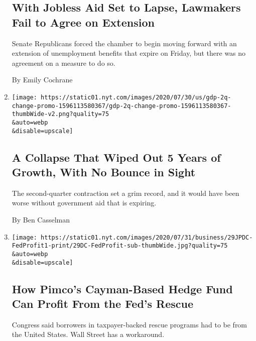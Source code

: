 \begin{enumerate}
{  \subsection{With Jobless Aid Set to Lapse, Lawmakers Fail to Agree on
  Extension}\label{with-jobless-aid-set-to-lapse-lawmakers-fail-to-agree-on-extension}}

  Senate Republicans forced the chamber to begin moving forward with an
  extension of unemployment benefits that expire on Friday, but there
  was no agreement on a measure to do so.

  By Emily Cochrane
\item
  \href{/2020/07/30/business/economy/q2-gdp-coronavirus-economy.html}{}

  \texttt{[image: https://static01.nyt.com/images/2020/07/30/us/gdp-2q-change-promo-1596113580367/gdp-2q-change-promo-1596113580367-thumbWide-v2.png?quality=75\\\&auto=webp\\\&disable=upscale]}

  \hypertarget{a-collapse-that-wiped-out-5-years-of-growth-with-no-bounce-in-sight}{%
  \subsection{A Collapse That Wiped Out 5 Years of Growth, With No
  Bounce in
  Sight}\label{a-collapse-that-wiped-out-5-years-of-growth-with-no-bounce-in-sight}}

  The second-quarter contraction set a grim record, and it would have
  been worse without government aid that is expiring.

  By Ben Casselman
\item
  \href{/2020/07/30/business/economy/fed-talf-wall-street.html}{}

  \texttt{[image: https://static01.nyt.com/images/2020/07/31/business/29JPDC-FedProfit1-print/29DC-FedProfit-sub-thumbWide.jpg?quality=75\\\&auto=webp\\\&disable=upscale]}

  \hypertarget{how-pimcos-cayman-based-hedge-fund-can-profit-from-the-feds-rescue}{%
  \subsection{How Pimco's Cayman-Based Hedge Fund Can Profit From the
  Fed's
  Rescue}\label{how-pimcos-cayman-based-hedge-fund-can-profit-from-the-feds-rescue}}

  Congress said borrowers in taxpayer-backed rescue programs had to be
  from the United States. Wall Street has a workaround.


\end{enumerate}
